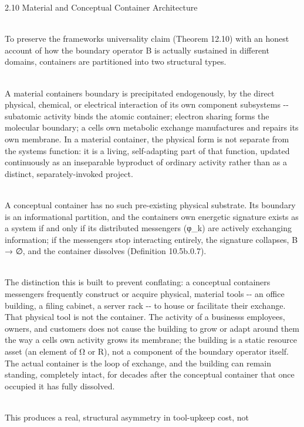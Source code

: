 \documentclass[
]{article}
\begin{document}
2.10 Material and Conceptual Container Architecture\\
\strut \\
To preserve the framework\textquotesingle s universality claim (Theorem
12.10) with an honest account of how the boundary operator B is actually
sustained in different domains, containers are partitioned into two
structural types.\\
\strut \\
A material container\textquotesingle s boundary is precipitated
endogenously, by the direct physical, chemical, or electrical
interaction of its own component subsystems -\/- subatomic activity
binds the atomic container; electron sharing forms the molecular
boundary; a cell\textquotesingle s own metabolic exchange manufactures
and repairs its own membrane. In a material container, the physical form
is not separate from the system\textquotesingle s function: it is a
living, self-adapting part of that function, updated continuously as an
inseparable byproduct of ordinary activity rather than as a distinct,
separately-invoked project.\\
\strut \\
A conceptual container has no such pre-existing physical substrate. Its
boundary is an informational partition, and the
container\textquotesingle s own energetic signature exists as a system
if and only if its distributed messengers (φ\_k) are actively exchanging
information; if the messengers stop interacting entirely, the signature
collapses, B → ∅, and the container dissolves (Definition 10.5b.0.7).\\
\strut \\
The distinction this is built to prevent conflating: a conceptual
container\textquotesingle s messengers frequently construct or acquire
physical, material tools -\/- an office building, a filing cabinet, a
server rack -\/- to house or facilitate their exchange. That physical
tool is not the container. The activity of a business\textquotesingle s
employees, owners, and customers does not cause the building to grow or
adapt around them the way a cell\textquotesingle s own activity grows
its membrane; the building is a static resource asset (an element of Ω
or R), not a component of the boundary operator itself. The actual
container is the loop of exchange, and the building can remain standing,
completely intact, for decades after the conceptual container that once
occupied it has fully dissolved.\\
\strut \\
This produces a real, structural asymmetry in tool-upkeep cost, not
\end{document}
